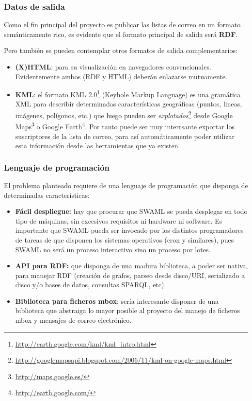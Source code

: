 \subsubsection{Datos de salida}

Como el fin principal del proyecto es publicar las listas de correo en un
formato semánticamente rico, es evidente que el formato principal de salida
será \textbf{RDF}.

Pero también se pueden contemplar otros formatos de salida complementarios:

\begin{itemize}
  \item \textbf{(X)HTML}: para su visualización en navegadores convencionales.
	Evidentemente ambos (RDF y HTML) deberán enlazarse mutuamente.
  \item \textbf{KML}: el formato KML 2.0\footnote{\url{http://earth.google.com/kml/kml_intro.html}}
	(Keyhole Markup Language) es una gramática XML para describir determinadas
	características geográficas (puntos, lineas, imágenes, polígonos, etc.)
	que luego pueden ser 
	\emph{explotados}\footnote{\url{http://googlemapsapi.blogspot.com/2006/11/kml-on-google-maps.html}} 
	desde Google Maps\footnote{\url{http://maps.google.es/}} o
	Google Earth\footnote{\url{http://earth.google.com/}}. Por tanto
	puede ser muy interrsante exportar los suscriptores de la lista de
	correo, para así automáticamente poder utilizar esta información
	desde las herramientas que ya existen.
\end{itemize}

\subsubsection{Lenguaje de programación}

El problema planteado requiere de una lenguaje de programación que disponga
de determinadas características:

\begin{itemize}
  \item \textbf{Fácil despliegue:} hay que procurar que SWAML se pueda desplegar 
	en todo tipo de máquinas, sin excesivos requisitos ni hardware ni software.
	Es importante que SWAML pueda ser invocado por los distintos programadores
	de tareas de que disponen los sistemas operativos (cron y similares), pues
	SWAML no será un proceso interactivo sino un proceso por lotes.
  \item \textbf{API para RDF:} que disponga de una madura biblioteca, a poder ser 
	nativa, para manejar RDF (creación de grafos, parseo desde disco/URI, 
	serializado a disco y/o bases de datos, consultas SPARQL, etc).
  \item \textbf{Biblioteca para ficheros mbox}: sería interesante disponer de una 
	biblioteca que abstraiga lo mayor posible al proyecto del manejo de ficheros
	mbox\cite{Hall2005} y mensajes de correo electrónico\cite{Resnick2001}.
\end{itemize}

